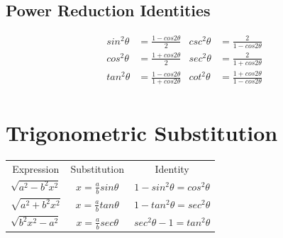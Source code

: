 \documentclass[12pt, letterpaper]{article}
\begin{document}
\subsection{Power Reduction Identities}
\begin{align*}
  sin^2\theta &= \frac{1-cos2\theta}{2}&
    csc^2\theta &= \frac{2}{1-cos2\theta}\\
  cos^2\theta &= \frac{1+cos2\theta}{2}&
    sec^2\theta &= \frac{2}{1+cos2\theta}\\
  tan^2\theta &= \frac{1-cos2\theta}{1+cos2\theta}&
    cot^2\theta &= \frac{1+cos2\theta}{1-cos2\theta}\\
\end{align*}

\section{Trigonometric Substitution}
\begin{center}
\begin{tabular}{c c c}
Expression & Substitution & Identity\\
$\sqrt{a^2 - b^2 x^2}$ & $x = \frac{a}{b} sin\theta$ & $1-sin^2 \theta = cos^2 \theta$\\
$\sqrt{a^2 + b^2 x^2}$ & $x = \frac{a}{b} tan\theta$ & $1-tan^2\theta = sec^2\theta$\\
$\sqrt{b^2 x^2 - a^2}$ & $x = \frac{a}{b} sec\theta$ & $sec^2\theta - 1 = tan^2 \theta$
\end{tabular}
\end{center}
\end{document}
